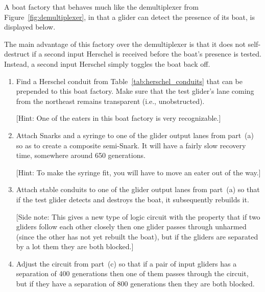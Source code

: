 \begin{multicols}{2}
	\mfilbreak
	
	
	\begin{problem}\label{exer:toggle_better_demultiplexer}
		A boat factory that behaves much like the demultiplexer from Figure~\ref{fig:demultiplexer}, in that a glider can detect the presence of its boat, is displayed below.
		
		\begin{center}
		\end{center}
	
		\noindent The main advantage of this factory over the demultiplexer is that it does not self-destruct if a second input Herschel is received before the boat's presence is tested. Instead, a second input Herschel simply toggles the boat back off.\smallskip
	
		\begin{enumerate}[label=\bf\color{ocre}(\alph*)]
			\item {} Find a Herschel conduit from Table~\ref{tab:herschel_conduits} that can be prepended to this boat factory. Make sure that the test glider's lane coming from the northeast remains transparent (i.e., unobstructed).
			
			[Hint: One of the eaters in this boat factory is very recognizable.]
			
			\item {} Attach Snarks and a syringe to one of the glider output lanes from part~(a) so as to create a composite semi-Snark. It will have a fairly slow recovery time, somewhere around 650 generations.
			
			[Hint: To make the syringe fit, you will have to move an eater out of the way.]
			
			\item {} Attach stable conduits to one of the glider output lanes from part~(a) so that if the test glider detects and destroys the boat, it subsequently rebuilds it.
			
			[Side note: This gives a new type of logic circuit with the property that if two gliders follow each other closely then one glider passes through unharmed (since the other has not yet rebuilt the boat), but if the gliders are separated by a lot them they are both blocked.]
			
			\item {} Adjust the circuit from part~(c) so that if a pair of input gliders has a separation of 400 generations then one of them passes through the circuit, but if they have a separation of 800 generations then they are both blocked.
		\end{enumerate}
	\end{problem}
	

\end{multicols}
